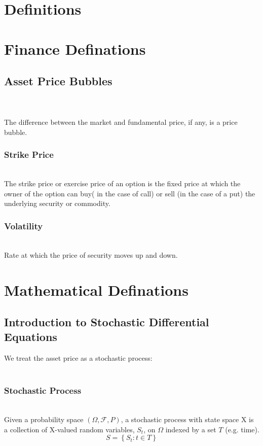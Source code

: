 \section{Definitions}
\section*{Finance Definations}
\subsection{Asset Price Bubbles}\\\\
 The difference between the market and fundamental price, if any, is a price bubble.\\
 
\subsubsection{Strike Price}\\
 The strike price or exercise price of an option is the fixed price at which the owner of the option can buy( in the case of call) or sell (in the case of a put) the underlying security or commodity.\\

\subsubsection{Volatility}\\
Rate at which the price of security moves up and down.


\section*{Mathematical Definations}
\subsection{Introduction to Stochastic Differential Equations}
We treat the asset price as a stochastic process:\\\\
\subsubsection{Stochastic Process}\\
Given a probability space $\left( \Omega, \mathcal{F}, P \right) $, a stochastic process with state space X is a
collection of X-valued random variables, $S_t$, on $\Omega$ indexed by a set $T$ (e.g. time).
\begin{equation}\label{eqnModelling2-1}
S = \left\lbrace S_t : t\in T \right\rbrace 
\end{equation}

